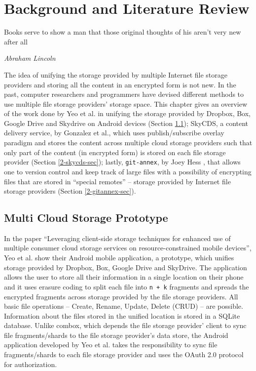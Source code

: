 \chapter{Background and Literature Review}

\epigraph{Books serve to show a man that those original thoughts of
  his aren't very new after all}{\textit{Abraham Lincoln}}

The idea of unifying the storage provided by multiple Internet file
storage providers and storing all the content in an encrypted form is
not new. In the past, computer researchers and programmers have
devised different methods to use multiple file storage providers'
storage space. This chapter gives an overview of the work done by Yeo
et al. in unifying the storage provided by Dropbox, Box, Google Drive
and Skydrive on Android devices \cite{yeo}(Section \ref{2-yeo-sec});
SkyCDS, a content delivery service, by Gonzalez et al., which uses
publish/subscribe overlay paradigm and stores the content across
multiple cloud storage providers such that only part of the content
(in encrypted form) is stored on each file storage provider
\cite{skycds}(Section \ref{2-skycds-sec}); lastly, \verb+git-annex+,
by Joey Hess \cite{person:joeyh}, that allows one to version control
and keep track of large files with a possibility of encrypting files
that are stored in ``special remotes'' -- storage provided by Internet
file storage providers (Section \ref{2-gitannex-sec}).

\section{Multi Cloud Storage Prototype}\label{2-yeo-sec}

In the paper ``Leveraging client-side storage techniques for enhanced
use of multiple consumer cloud storage services on
resource-constrained mobile devices'', Yeo et al. show their Android
mobile application, a prototype, which unifies storage provided by
Dropbox, Box, Google Drive and SkyDrive. The application allows the
user to store all their information in a single location on their
phone and it uses erasure coding \cite{weatherspoon} to split each
file into \verb`n + k` fragments and spreads the encrypted fragments
across storage provided by the file storage providers. All basic file
operations -- Create, Rename, Update, Delete (CRUD) -- are
possible. Information about the files stored in the unified location
is stored in a SQLite database. Unlike combox, which depends the file
storage provider' client to sync file fragments/shards to the file
storage provider's data store, the Android application developed by
Yeo et al. takes the responsibility to sync file fragments/shards to
each file storage provider and uses the OAuth 2.0
\cite{protocol:oauth2} protocol for authorization.

